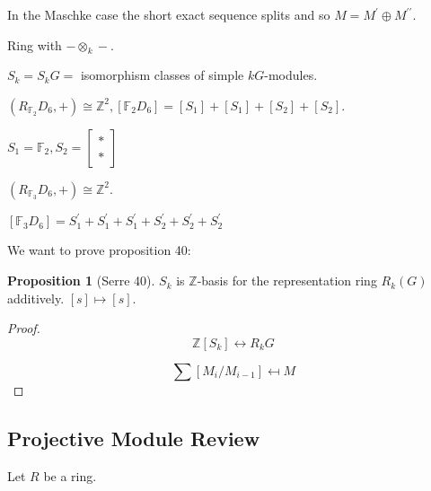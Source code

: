 \documentclass{article}
\theoremstyle{definition}
\newtheorem{proposition}[theorem]{Proposition}
\begin{document}
In the Maschke case the short exact sequence splits and so \(M = M^{\prime} \oplus M^{\prime\prime}\). 


Ring with \(- \otimes_k -\).


\(S_k = S_k G =\) isomorphism classes of simple \(kG\)-modules.

\((R_{\mathbb{F}_2} D_6, +) \cong \mathbb{Z}^2, [\mathbb{F}_2 D_6] = [S_1] + [S_1] + [S_2] + [S_2]\).

\(S_1 = \mathbb{F}_2, S_2 = \begin{bmatrix}
    \ast \\ \ast 
\end{bmatrix}\) 

\((R_{\mathbb{F}_3}D_6, +) \cong \mathbb{Z}^2\).

\([\mathbb{F}_3 D_6] = S_1^{\prime} + S_1^{\prime} +S_1^{\prime} + S_2^{\prime} + S_2^{\prime} + S_2^{\prime}\)

We want to prove proposition 40:

\begin{proposition}
    [Serre 40] \(S_k\) is \(\mathbb{Z}\)-basis for the representation ring \(R_k(G)\) additively. \([s] \mapsto [s]\).
\end{proposition}

\begin{proof}
    \[
        \mathbb{Z}[S_k] \leftrightarrow R_k G
    \]

    \[
        \sum [M_i / M_{i-1}] \mapsfrom M
    \]
\end{proof}

\subsection*{Projective Module Review}

Let \(R\) be a ring.
\end{document}
